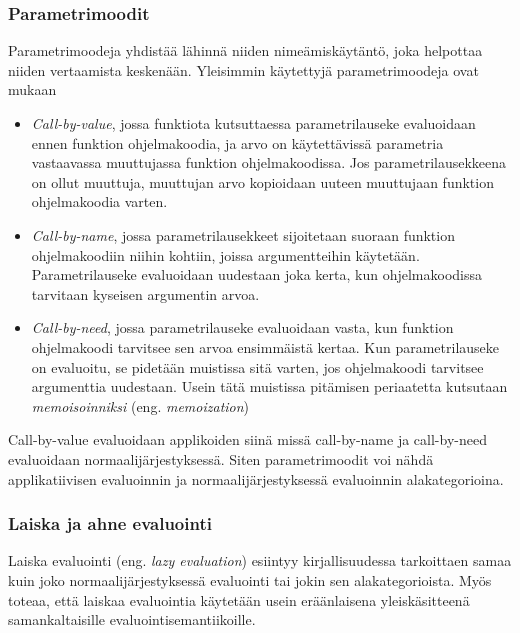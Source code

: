 \subsubsection{Parametrimoodit}

Parametrimoodeja yhdistää lähinnä niiden nimeämiskäytäntö, joka helpottaa niiden vertaamista keskenään. Yleisimmin käytettyjä parametrimoodeja ovat \citet{scott2009programming} mukaan

\begin{itemize}
	\item \textit{Call-by-value}, jossa funktiota kutsuttaessa parametrilauseke evaluoidaan ennen funktion ohjelmakoodia, ja arvo on käytettävissä parametria vastaavassa muuttujassa funktion ohjelmakoodissa. Jos parametrilausekkeena on ollut muuttuja, muuttujan arvo kopioidaan uuteen muuttujaan funktion ohjelmakoodia varten.
    \item \textit{Call-by-name}, jossa parametrilausekkeet sijoitetaan suoraan funktion ohjelmakoodiin niihin kohtiin, joissa argumentteihin käytetään. Parametrilauseke evaluoidaan uudestaan joka kerta, kun ohjelmakoodissa tarvitaan kyseisen argumentin arvoa.
    \item \textit{Call-by-need}, jossa parametrilauseke evaluoidaan vasta, kun funktion ohjelmakoodi tarvitsee sen arvoa ensimmäistä kertaa. Kun parametrilauseke on evaluoitu, se pidetään muistissa sitä varten, jos ohjelmakoodi tarvitsee argumenttia uudestaan. Usein tätä muistissa pitämisen periaatetta kutsutaan \textit{memoisoinniksi} (eng. \textit{memoization})
\end{itemize}

Call-by-value evaluoidaan applikoiden siinä missä call-by-name ja call-by-need evaluoidaan normaalijärjestyksessä. Siten parametrimoodit voi nähdä applikatiivisen evaluoinnin ja normaalijärjestyksessä evaluoinnin alakategorioina.

\subsubsection{Laiska ja ahne evaluointi}

Laiska evaluointi (eng. \textit{lazy evaluation}) esiintyy kirjallisuudessa tarkoittaen samaa kuin joko normaalijärjestyksessä evaluointi tai jokin sen alakategorioista. Myös \citet{scott2009programming} toteaa, että laiskaa evaluointia käytetään usein eräänlaisena yleiskäsitteenä samankaltaisille evaluointisemantiikoille.

